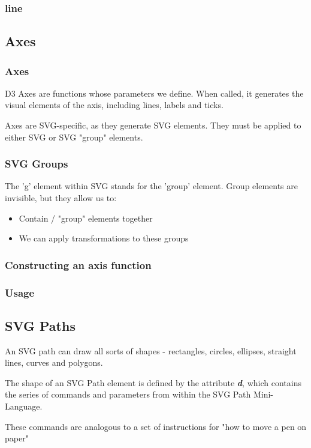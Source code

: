 \documentclass[red]{beamer}
\begin{document}
\begin{frame}
  \frametitle{line}
  \lstline
\end{frame}

\subsection{Axes}

\begin{frame}
  \frametitle{Axes}
  D3 Axes are functions whose parameters we define. When called, it generates the visual elements of the axis, including lines, labels and ticks. 
  \newline

  Axes are SVG-specific, as they generate SVG elements. They must be applied to either SVG or SVG "group" elements. 
\end{frame}

\begin{frame}
  \frametitle{SVG Groups}
  The 'g' element within SVG stands for the 'group' element. Group elements are invisible, but they allow us to:
  \begin{itemize}
  \item<1-> Contain / "group" elements together
  \item<2-> We can apply transformations to these groups
  \end{itemize}
\end{frame}

\begin{frame}
  \frametitle{Constructing an axis function}
  \lstaxis
\end{frame}


\begin{frame}
  \frametitle{Usage}
  \lstcreateaxis
\end{frame}

\subsection{SVG Paths}
\begin{frame}
  An SVG path can draw all sorts of shapes - rectangles, circles, ellipses, straight lines, curves and polygons. 
  \newline

  The shape of an SVG Path element is defined by the attribute \textit{\textbf{d}}, which contains the series of commands and parameters from within the SVG Path Mini-Language. 
  \newline

  These commands are analogous to a set of instructions for "how to move a pen on paper"
\end{frame}
\end{document}
